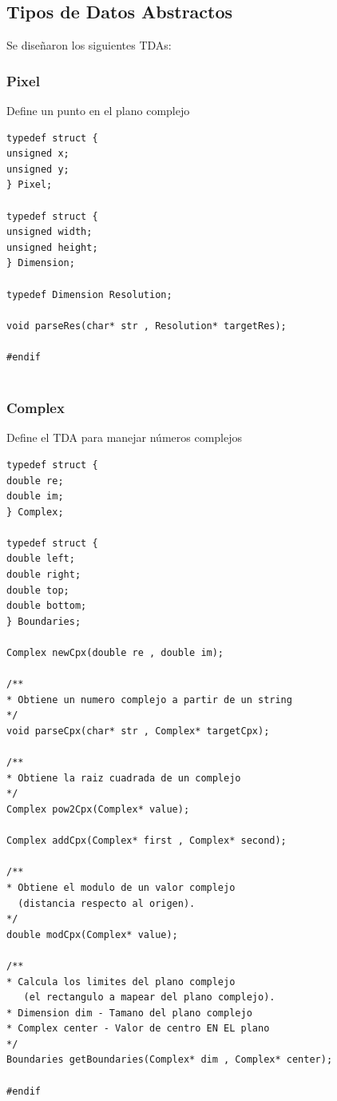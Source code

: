 \documentclass [12pt, a4paper]{article}
\begin{document}
	\subsection{Tipos de Datos Abstractos}
	Se diseñaron los siguientes TDAs:
	\subsubsection{\textbf{Pixel}}
		Define un punto en el plano complejo
	\begin{lstlisting}[frame=single]
typedef struct {
unsigned x;
unsigned y;
} Pixel;

typedef struct {
unsigned width;
unsigned height;  
} Dimension;

typedef Dimension Resolution;

void parseRes(char* str , Resolution* targetRes);

#endif
		
	\end{lstlisting}
	
	\vspace{5mm}
	\subsubsection{\textbf{Complex}}
		Define el TDA para manejar números complejos
	\begin{lstlisting}[frame=single]
typedef struct {
double re;
double im;
} Complex;

typedef struct {
double left;
double right;
double top;
double bottom;
} Boundaries;

Complex newCpx(double re , double im);

/** 
* Obtiene un numero complejo a partir de un string
*/
void parseCpx(char* str , Complex* targetCpx);

/**
* Obtiene la raiz cuadrada de un complejo
*/
Complex pow2Cpx(Complex* value);

Complex addCpx(Complex* first , Complex* second);

/** 
* Obtiene el modulo de un valor complejo 
  (distancia respecto al origen).
*/
double modCpx(Complex* value);

/** 
* Calcula los limites del plano complejo 
   (el rectangulo a mapear del plano complejo).
* Dimension dim - Tamano del plano complejo
* Complex center - Valor de centro EN EL plano
*/
Boundaries getBoundaries(Complex* dim , Complex* center);

#endif

	\end{lstlisting}
	
\end{document}
